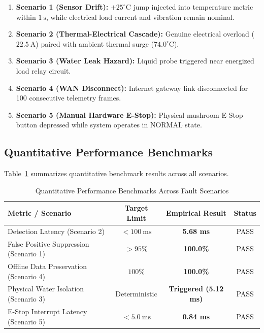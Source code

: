 \documentclass[conference]{IEEEtran}
\begin{document}
\begin{enumerate}
    \item \textbf{Scenario 1 (Sensor Drift):} $+25^\circ\text{C}$ jump injected into temperature metric within $1~\text{s}$, while electrical load current and vibration remain nominal.
    \item \textbf{Scenario 2 (Thermal-Electrical Cascade):} Genuine electrical overload ($22.5~\text{A}$) paired with ambient thermal surge ($74.0^\circ\text{C}$).
    \item \textbf{Scenario 3 (Water Leak Hazard):} Liquid probe triggered near energized load relay circuit.
    \item \textbf{Scenario 4 (WAN Disconnect):} Internet gateway link disconnected for 100 consecutive telemetry frames.
    \item \textbf{Scenario 5 (Manual Hardware E-Stop):} Physical mushroom E-Stop button depressed while system operates in NORMAL state.
\end{enumerate}

\subsection{Quantitative Performance Benchmarks}
Table~\ref{tab:benchmarks} summarizes quantitative benchmark results across all scenarios.

\begin{table}[htbp]
\caption{Quantitative Performance Benchmarks Across Fault Scenarios}
\label{tab:benchmarks}
\begin{center}
\begin{tabular}{|l|c|c|c|}
\hline
\textbf{Metric / Scenario} & \textbf{Target Limit} & \textbf{Empirical Result} & \textbf{Status} \\
\hline
Detection Latency (Scenario 2) & $< 100~\text{ms}$ & \textbf{5.68 ms} & PASS \\
False Positive Suppression (Scenario 1) & $> 95\%$ & \textbf{100.0\%} & PASS \\
Offline Data Preservation (Scenario 4) & $100\%$ & \textbf{100.0\%} & PASS \\
Physical Water Isolation (Scenario 3) & Deterministic & \textbf{Triggered (5.12 ms)} & PASS \\
E-Stop Interrupt Latency (Scenario 5) & $< 5.0~\text{ms}$ & \textbf{0.84 ms} & PASS \\
\hline
\end{tabular}
\end{center}
\end{table}
\end{document}
